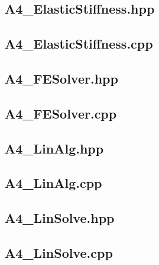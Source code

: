 \documentclass[a4paper, 12pt]{article}
\begin{document}
\subsection{A4\_ElasticStiffness.hpp} \label{subsec:ElasticStiffness.hpp}


\subsection{A4\_ElasticStiffness.cpp} \label{subsec:ElasticStiffness.cpp}


\subsection{A4\_FESolver.hpp} \label{subsec:FESolver.hpp}


\subsection{A4\_FESolver.cpp} \label{subsec:FESolver.cpp}


\subsection{A4\_LinAlg.hpp} \label{subsec:LinAlg.hpp}


\subsection{A4\_LinAlg.cpp} \label{subsec:LinAlg.cpp}


\subsection{A4\_LinSolve.hpp} \label{subsec:LinSolve.hpp}


\subsection{A4\_LinSolve.cpp} \label{subsec:LinSolve.cpp}

\end{document}
